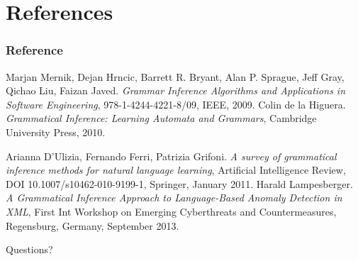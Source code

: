 \documentclass[11pt]{beamer}
\begin{document}
\section{References}

\begin{frame}[allowframebreaks]
  \frametitle<presentation>{Reference}
  \small
  \begin{thebibliography}{10}
    \beamertemplatebookbibitems
   Marjan Mernik, Dejan Hrncic, Barrett R. Bryant,
    Alan P. Sprague, Jeff Gray, Qichao Liu, Faizan Javed.
    \emph{Grammar Inference Algorithms and Applications in Software
      Engineering}, 978-1-4244-4221-8/09, IEEE, 2009.
   Colin de la Higuera.
    \emph{Grammatical Inference: Learning Automata and Grammars},
    Cambridge University Press, 2010.
 
    \beamertemplatearticlebibitems

   Arianna D'Ulizia, Fernando Ferri, Patrizia
    Grifoni.
    \emph{A survey of grammatical inference methods for natural
      language learning},
    Artificial Intelligence Review, DOI 10.1007/s10462-010-9199-1,
    Springer, January 2011.
   Harald Lampesberger. 
    \emph{A Grammatical Inference Approach to Language-Based Anomaly
      Detection in XML},
    First Int Workshop on Emerging Cyberthreats and Countermeasures,
    Regensburg, Germany, September 2013.
  \end{thebibliography}
\end{frame}

\begin{frame}
  \vfill
  \begin{center}
    Questions?
  \end{center}
  \vfill
  
\end{frame}
\end{document}
